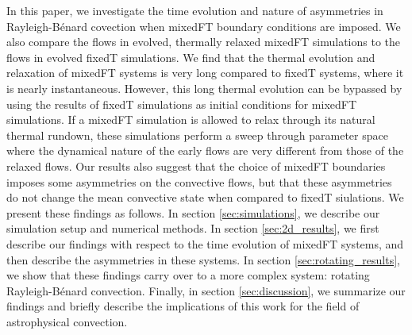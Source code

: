 \documentclass[aps, pre, onecolumn, nofootinbib, notitlepage, groupedaddress, amsfonts, amssymb, amsmath, longbibliography, superscriptaddress]{revtex4-1}
\newcommand{\RB}{Rayleigh-B\'{e}nard }
\begin{document}
In this paper, we investigate the time evolution and nature of asymmetries in \RB covection when mixedFT boundary conditions are imposed.
We also compare the flows in evolved, thermally relaxed mixedFT simulations to the flows in evolved fixedT simulations.
We find that the thermal evolution and relaxation of mixedFT systems is very long compared to fixedT systems, where it is nearly instantaneous.
However, this long thermal evolution can be bypassed by using the results of fixedT simulations as initial conditions for mixedFT simulations.
If a mixedFT simulation is allowed to relax through its natural thermal rundown, these simulations perform a sweep through parameter space where the dynamical nature of the early flows are very different from those of the relaxed flows.
Our results also suggest that the choice of mixedFT boundaries imposes some asymmetries on the convective flows, but that these asymmetries do not change the mean convective state when compared to fixedT siulations.
We present these findings as follows.
In section \ref{sec:simulations}, we describe our simulation setup and numerical methods.
In section \ref{sec:2d_results}, we first describe our findings with respect to the time evolution of mixedFT systems, and then describe the asymmetries in these systems.
In section \ref{sec:rotating_results}, we show that these findings carry over to a more complex system: rotating \RB convection.
Finally, in section \ref{sec:discussion}, we summarize our findings and briefly describe the implications of this work for the field of astrophysical convection.

\end{document}
